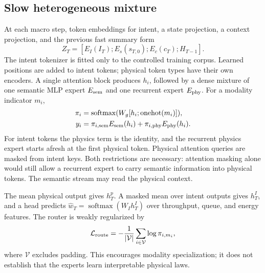\documentclass[10pt,twocolumn]{article}
\begin{document}
\subsection{Slow heterogeneous mixture}
At each macro step, token embeddings for intent, a state projection, a context
projection, and the previous fast summary form
\begin{equation}
 Z_T=[E_I(I_T);E_s(s_{T,0});E_c(c_T);H_{T-1}].
\end{equation}
The intent tokenizer is fitted only to the controlled training corpus. Learned
positions are added to intent tokens; physical token types have their own
encoders. A single attention block produces $h_i$, followed by a dense mixture
of one semantic MLP expert $E_{\rm sem}$ and one recurrent expert
$E_{\rm phy}$. For a modality indicator $m_i$,
\begin{align}
 \pi_i &=\operatorname{softmax}(W_g[h_i;\operatorname{onehot}(m_i)]),\\
 y_i &=\pi_{i,\rm sem}E_{\rm sem}(h_i)
       +\pi_{i,\rm phy}E_{\rm phy}(h_i).
\end{align}
For intent tokens the physics term is the identity, and the recurrent physics
expert starts afresh at the first physical token. Physical attention queries
are masked from intent keys. Both restrictions are necessary: attention masking
alone would still allow a recurrent expert to carry semantic information into
physical tokens. The semantic stream may read the physical context.

The mean physical output gives $h_T^p$. A masked mean over intent outputs gives
$h_T^I$, and a head predicts
$\hat w_T=\operatorname{softmax}(W_I h_T^I)$ over throughput, queue, and energy
features. The router is weakly regularized by
\begin{equation}
 \mathcal L_{\rm route}=-\frac{1}{|\mathcal V|}
 \sum_{i\in\mathcal V}\log\pi_{i,m_i},
\end{equation}
where $\mathcal V$ excludes padding. This encourages modality specialization;
it does not establish that the experts learn interpretable physical laws.
\end{document}
